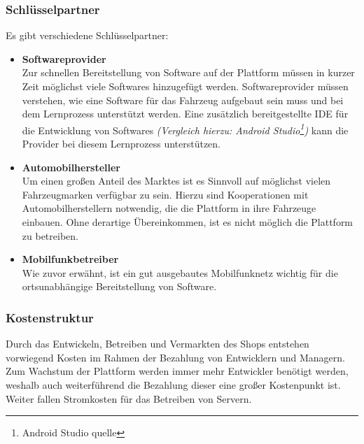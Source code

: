 \subsubsection{Schlüsselpartner}
Es gibt verschiedene Schlüsselpartner:
\begin{itemize}
	\item \textbf{Softwareprovider}\\
	Zur schnellen Bereitstellung von Software auf der Plattform müssen in kurzer Zeit möglichst viele Softwares hinzugefügt werden. Softwareprovider müssen verstehen, wie eine Software für das Fahrzeug aufgebaut sein muss und bei dem Lernprozess unterstützt werden. Eine zusätzlich bereitgestellte IDE für die Entwicklung von Softwares \textit{(Vergleich hierzu: Android Studio\footnote{Android Studio quelle})} kann die Provider bei diesem Lernprozess unterstützen.
	
	\item \textbf{Automobilhersteller}\\
	Um einen großen Anteil des Marktes ist es Sinnvoll auf möglichst vielen Fahrzeugmarken verfügbar zu sein. Hierzu sind Kooperationen mit Automobilherstellern notwendig, die die Plattform in ihre Fahrzeuge einbauen. Ohne derartige Übereinkommen, ist es nicht möglich die Plattform zu betreiben.
	
	\item \textbf{Mobilfunkbetreiber}\\
	Wie zuvor erwähnt, ist ein gut ausgebautes Mobilfunknetz wichtig für die ortsunabhängige Bereitstellung von Software. 
	
\end{itemize}

\subsubsection{Kostenstruktur}
Durch das Entwickeln, Betreiben und Vermarkten des Shops entstehen vorwiegend Kosten im Rahmen der Bezahlung von Entwicklern und Managern. Zum Wachstum der Plattform werden immer mehr Entwickler benötigt werden, weshalb auch weiterführend die Bezahlung dieser eine großer Kostenpunkt ist. Weiter fallen Stromkosten für das Betreiben von Servern.